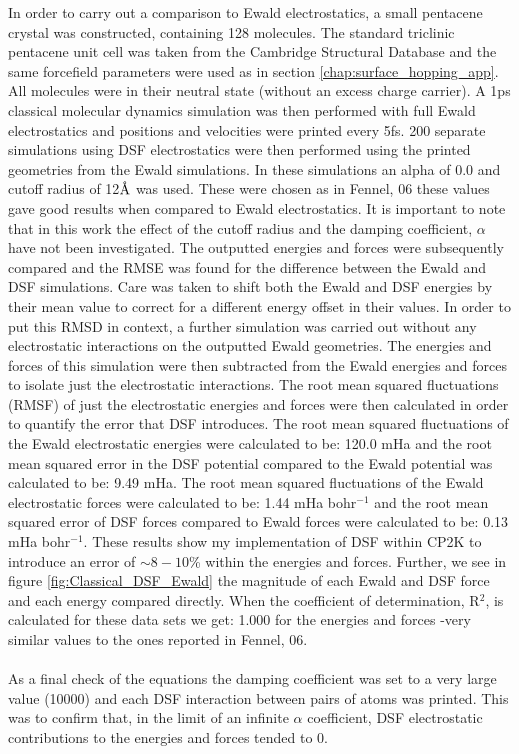 In order to carry out a comparison to Ewald electrostatics, a small pentacene crystal was constructed, containing 128 molecules. The standard triclinic pentacene unit cell was taken from the Cambridge Structural Database \cite{CSD} and the same forcefield parameters were used as in section \ref{chap:surface_hopping_app}. All molecules were in their neutral state (without an excess charge carrier). A 1ps classical molecular dynamics simulation was then performed with full Ewald electrostatics and positions and velocities were printed every 5fs. 200 separate simulations using DSF electrostatics were then performed using the printed geometries from the Ewald simulations. In these simulations an alpha of 0.0 and cutoff radius of 12$\text{\normalfont\AA}$ was used. These were chosen as in Fennel, 06 \cite{DSF} these values gave good results when compared to Ewald electrostatics. It is important to note that in this work the effect of the cutoff radius and the damping coefficient, $\alpha$ have not been investigated. The outputted energies and forces were subsequently compared and the RMSE was found for the difference between the Ewald and DSF simulations. Care was taken to shift both the Ewald and DSF energies by their mean value to correct for a different energy offset in their values. In order to put this RMSD in context, a further simulation was carried out without any electrostatic interactions on the outputted Ewald geometries. The energies and forces of this simulation were then subtracted from the Ewald energies and forces to isolate just the electrostatic interactions. The root mean squared fluctuations (RMSF) of just the electrostatic energies and forces were then calculated in order to quantify the error that DSF introduces. The root mean squared fluctuations of the Ewald electrostatic energies were calculated to be: 120.0 mHa and the root mean squared error in the DSF potential compared to the Ewald potential was calculated to be: 9.49 mHa. The root mean squared fluctuations of the Ewald electrostatic forces were calculated to be: 1.44 mHa bohr$^{-1}$ and the root mean squared error of DSF forces compared to Ewald forces were calculated to be: 0.13 mHa bohr$^{-1}$. These results show my implementation of DSF within CP2K to introduce an error of $\sim 8-10$\% within the energies and forces. Further, we see in figure \ref{fig:Classical_DSF_Ewald} the magnitude of each Ewald and DSF force and each energy compared directly. When the coefficient of determination, R$^2$, is calculated for these data sets we get: 1.000 for the energies and forces -very similar values to the ones reported in Fennel, 06.
\\\\
As a final check of the equations the damping coefficient was set to a very large value (10000) and each DSF interaction between pairs of atoms was printed. This was to confirm that, in the limit of an infinite $\alpha$ coefficient, DSF electrostatic contributions to the energies and forces tended to 0. 
